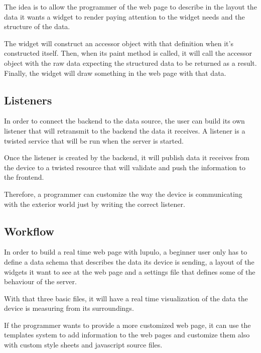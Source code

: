 \documentclass[12pt]{article}
\begin{document}
            The idea is to allow the programmer of the web page to describe in
            the layout the data it wants a widget to render paying attention to
            the widget needs and the structure of the data.
            
            The widget will construct an accessor object with that definition
            when it's constructed itself. Then, when its paint method is called,
            it will call the accessor object with the raw data expecting the
            structured data to be returned as a result. Finally, the widget will
            draw something in the web page with that data.

        \subsection{Listeners}
            In order to connect the backend to the data source, the user can
            build its own listener that will retransmit to the backend the data
            it receives. A listener is a twisted service that will be run when
            the server is started.

            Once the listener is created by the backend, it will publish data it
            receives from the device to a twisted resource that will validate
            and push the information to the frontend.

            Therefore, a programmer can customize the way the device is
            communicating with the exterior world just by writing the correct
            listener.

        \subsection{Workflow}
            In order to build a real time web page with lupulo, a beginner user
            only has to define a data schema that describes the data its device
            is sending, a layout of the widgets it want to see at the web page
            and a settings file that defines some of the behaviour of the
            server.

            With that three basic files, it will have a real time visualization
            of the data the device is measuring from its surroundings.

            If the programmer wants to provide a more customized web page, it
            can use the templates system to add information to the web pages and
            customize them also with custom style sheets and javascript source
            files.
\end{document}
